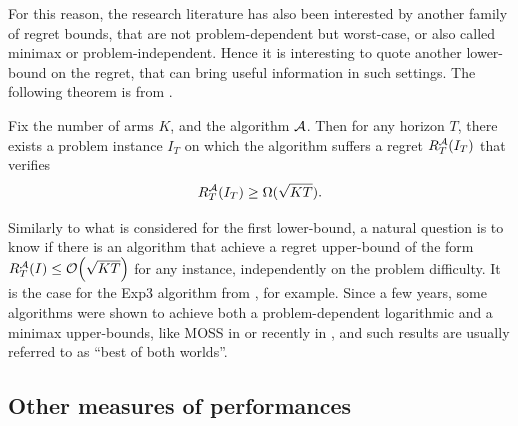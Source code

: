 For this reason, the research literature has also been interested by another family of regret bounds, that are not problem-dependent but worst-case, or also called minimax \cite{Audibert2009minimax,audibert2010minimax} or problem-independent.
Hence it is interesting to quote another lower-bound on the regret, that can bring useful information in such settings.
The following theorem is from \cite{Auer02NonStochastic}.

\begin{theorem}\label{thm:2:worstCaseLowerBound}
    Fix the number of arms $K$, and the algorithm $\mathcal{A}$.
    Then for any horizon $T$, there exists a problem instance $I_T$ on which the algorithm suffers a regret $R_T^{\mathcal{A}}(I_T)$ that verifies
    \begin{equation}
        R_T^{\mathcal{A}}(I_T) \geq \Omega(\sqrt{K T}).
    \end{equation}
\end{theorem}

Similarly to what is considered for the first lower-bound,
a natural question is to know if there is an algorithm that achieve a regret upper-bound of the form $R_T^{\mathcal{A}}(I) \leq \mathop{}\mathopen{}\mathcal{O}\mathopen{}\left(\sqrt{K T}\right)$ for any instance, independently on the problem difficulty.
It is the case for the Exp3 algorithm from \cite{Auer02}, for example.
Since a few years, some algorithms were shown to achieve both a problem-dependent logarithmic and a minimax upper-bounds,
like MOSS in \cite{Audibert2009minimax} or recently \KLUCBpp{} in \cite{Menard17},
and such results are usually referred to as ``best of both worlds''.





\subsection{Other measures of performances}

